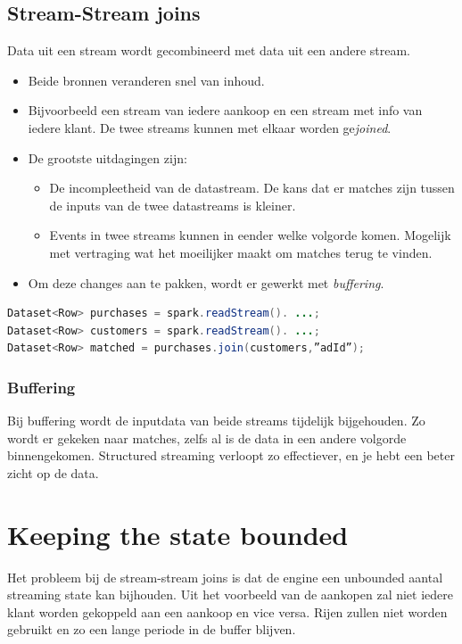 \documentclass[a4paper,10pt,twoside]{report}
\begin{document}
\subsection{Stream-Stream joins}

Data uit een stream wordt gecombineerd met data uit een andere stream. 

\begin{itemize}
	\item Beide bronnen veranderen snel van inhoud. 
	\item Bijvoorbeeld een stream van iedere aankoop en een stream met info van iedere klant. De twee streams kunnen met elkaar worden ge\textit{joined}.
	\item De grootste uitdagingen zijn:
	\begin{itemize}
		\item De incompleetheid van de datastream. De kans dat er matches zijn tussen de inputs van de twee datastreams is kleiner. 
		\item Events in twee streams kunnen in eender welke volgorde komen. Mogelijk met vertraging wat het moeilijker maakt om matches terug te vinden.
	\end{itemize} 
	\item Om deze changes aan te pakken, wordt er gewerkt met \textit{buffering}. 
\end{itemize}

\begin{lstlisting}[language=Java]
Dataset<Row> purchases = spark.readStream(). ...;
Dataset<Row> customers = spark.readStream(). ...;
Dataset<Row> matched = purchases.join(customers,”adId”);
\end{lstlisting}

\subsubsection{Buffering}

Bij buffering wordt de inputdata van beide streams tijdelijk bijgehouden. Zo wordt er gekeken naar matches, zelfs al is de data in een andere volgorde binnengekomen. Structured streaming verloopt zo effectiever, en je hebt een beter zicht op de data.

\section{Keeping the state bounded}

Het probleem bij de stream-stream joins is dat de engine een unbounded aantal streaming state kan bijhouden. Uit het voorbeeld van de aankopen zal niet iedere klant worden gekoppeld aan een aankoop en vice versa. Rijen zullen niet worden gebruikt en zo een lange periode in de buffer blijven.
\end{document}
